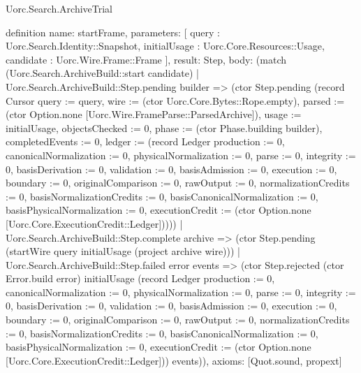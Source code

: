 \begin{lexlean}{Uorc.Search.ArchiveTrial}
\begin{semanticmodule}
definition{
  name: startFrame,
  parameters: [
    query : Uorc.Search.Identity::Snapshot,
    initialUsage : Uorc.Core.Resources::Usage,
    candidate : Uorc.Wire.Frame::Frame
  ],
  result: Step,
  body: (match (Uorc.Search.ArchiveBuild::start candidate)
    | Uorc.Search.ArchiveBuild::Step.pending builder => (ctor Step.pending (record Cursor {query := query, wire := (ctor Uorc.Core.Bytes::Rope.empty), parsed := (ctor Option.none [Uorc.Wire.FrameParse::ParsedArchive]), usage := initialUsage, objectsChecked := 0, phase := (ctor Phase.building builder), completedEvents := 0, ledger := (record Ledger {production := 0, canonicalNormalization := 0, physicalNormalization := 0, parse := 0, integrity := 0, basisDerivation := 0, validation := 0, basisAdmission := 0, execution := 0, boundary := 0, originalComparison := 0, rawOutput := 0, normalizationCredits := 0, basisNormalizationCredits := 0, basisCanonicalNormalization := 0, basisPhysicalNormalization := 0, executionCredit := (ctor Option.none [Uorc.Core.ExecutionCredit::Ledger])})}))
    | Uorc.Search.ArchiveBuild::Step.complete archive => (ctor Step.pending (startWire query initialUsage (project archive wire)))
    | Uorc.Search.ArchiveBuild::Step.failed error events => (ctor Step.rejected (ctor Error.build error) initialUsage (record Ledger {production := 0, canonicalNormalization := 0, physicalNormalization := 0, parse := 0, integrity := 0, basisDerivation := 0, validation := 0, basisAdmission := 0, execution := 0, boundary := 0, originalComparison := 0, rawOutput := 0, normalizationCredits := 0, basisNormalizationCredits := 0, basisCanonicalNormalization := 0, basisPhysicalNormalization := 0, executionCredit := (ctor Option.none [Uorc.Core.ExecutionCredit::Ledger])}) events)),
  axioms: [Quot.sound, propext]
}


\end{semanticmodule}
\end{lexlean}
